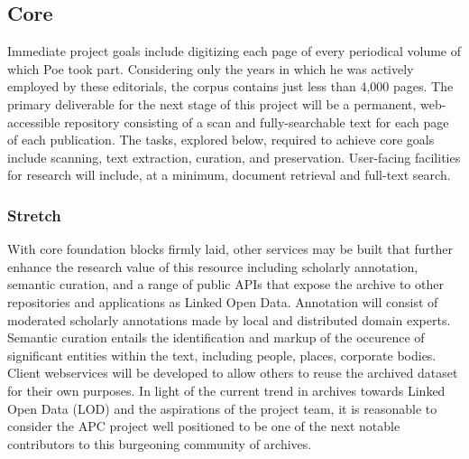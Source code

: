 \subsection{Core}
Immediate project goals include digitizing each page of every periodical volume of which Poe took part. Considering only the years in which he was actively employed by these editorials, the corpus contains just less than 4,000 pages. The primary deliverable for the next stage of this project will be a permanent, web-accessible repository consisting of a scan and fully-searchable text for each page of each publication. The tasks, explored below, required to achieve core goals include scanning, text extraction, curation, and preservation. User-facing facilities for research will include, at a minimum, document retrieval and full-text search. 

\subsubsection{Stretch}
With core foundation blocks firmly laid, other services may be built that further enhance the research value of this resource including scholarly annotation, semantic curation, and a range of public APIs that expose the archive to other repositories and applications as Linked Open Data. Annotation will consist of moderated scholarly annotations made by local and distributed domain experts.  Semantic curation entails the identification and markup of the occurence of significant entities within the text, including people, places, corporate bodies. Client webservices will be developed  to allow others to reuse the archived dataset for their own purposes. In light of the current trend \needcite in archives towards Linked Open Data (LOD) and the aspirations of the project team, it is reasonable to consider the APC project well positioned to be one of the next notable contributors to this burgeoning community of archives.